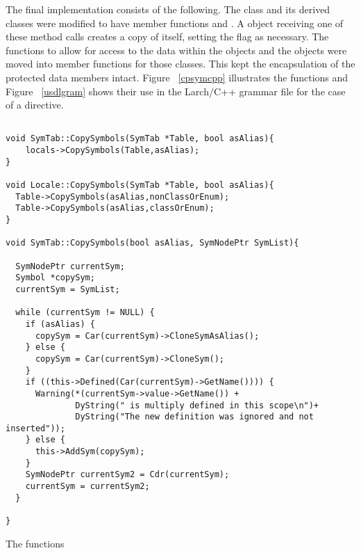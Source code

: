 The final implementation consists of the following. The  class
and its derived classes were modified to have member functions
 and . A 
object receiving one of these method calls creates a copy of itself,
setting the  flag as necessary. The functions to allow
for access to the data within the  objects and the
 objects were moved into member functions for those
classes. This kept the encapsulation of the protected data members
intact. Figure ~\ref{cpsymcpp} illustrates the
 functions and Figure ~\ref{usdlgram} shows
their use in the Larch/C++ grammar file for the case of a
 directive.
\begin{BFIGURE}
\begin{verbatim}

void SymTab::CopySymbols(SymTab *Table, bool asAlias){ 
    locals->CopySymbols(Table,asAlias);
}

void Locale::CopySymbols(SymTab *Table, bool asAlias){
  Table->CopySymbols(asAlias,nonClassOrEnum);
  Table->CopySymbols(asAlias,classOrEnum);
}

void SymTab::CopySymbols(bool asAlias, SymNodePtr SymList){
 
  SymNodePtr currentSym;
  Symbol *copySym;
  currentSym = SymList;

  while (currentSym != NULL) {
    if (asAlias) {
      copySym = Car(currentSym)->CloneSymAsAlias();
    } else {
      copySym = Car(currentSym)->CloneSym();
    }
    if ((this->Defined(Car(currentSym)->GetName()))) {
      Warning(*(currentSym->value->GetName()) +
              DyString(" is multiply defined in this scope\n")+
              DyString("The new definition was ignored and not inserted"));
    } else {
      this->AddSym(copySym);
    }
    SymNodePtr currentSym2 = Cdr(currentSym);
    currentSym = currentSym2;
  }

}
\end{verbatim}
\caption{The  functions}
\label{cpsymcpp}
\end{BFIGURE}

